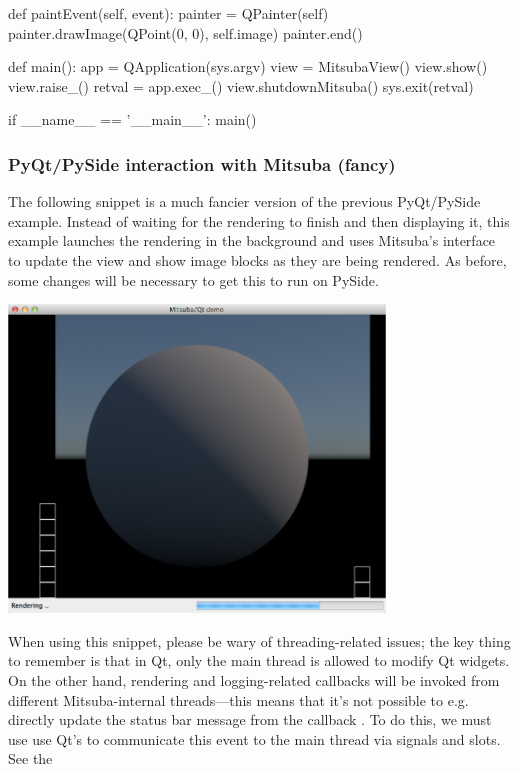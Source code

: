 \begin{python}
    def paintEvent(self, event):
        painter = QPainter(self)
        painter.drawImage(QPoint(0, 0), self.image)
        painter.end()

def main():
    app = QApplication(sys.argv)
    view = MitsubaView()
    view.show()
    view.raise_()
    retval = app.exec_()
    view.shutdownMitsuba()
    sys.exit(retval)

if __name__ == '__main__':
    main()
\end{python}

\subsubsection{PyQt/PySide interaction with Mitsuba (fancy)}
The following snippet is a much fancier version of the previous PyQt/PySide example.
Instead of waiting for the rendering to finish and then displaying it, this example launches the
rendering in the background and uses Mitsuba's  interface to update the
view and show image blocks as they are being rendered.
As before, some changes will be necessary to get this to run on PySide.
\begin{center}
    \includegraphics[width=10cm]{images/python_demo.jpg}
\end{center}
When using this snippet, please be wary of threading-related issues; the key thing to remember is that
in Qt, only the main thread is allowed to modify Qt widgets. On the other hand, rendering and logging-related
callbacks will be invoked from different Mitsuba-internal threads---this means that it's not possible to e.g.
directly update the status bar message from the callback . To do this, we must use
use Qt's  to communicate this event to the main thread via signals and slots. See the

